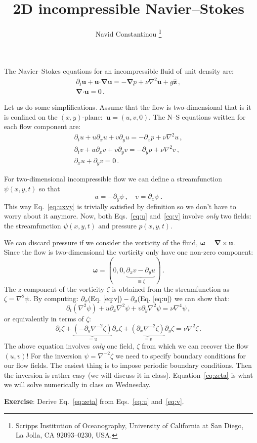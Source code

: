 \documentclass[11pt]{article}
\def\beq{\begin{equation}}
\def\eeq{\end{equation}}
\newcommand{\bu}{\boldsymbol{u}}
\providecommand\bnabla{\boldsymbol{\nabla}}
\providecommand\bcdot{\boldsymbol{\cdot}}
\newcommand{\com}{\, ,}
\newcommand{\per}{\, .}
\renewcommand{\(}{\left(}
\renewcommand{\[}{\left[}
\renewcommand{\)}{\right)}
\renewcommand{\]}{\right]}
\newcommand{\<}{\left\langle}
\renewcommand{\>}{\right\rangle}
\newcommand{\zhat}{\hat{\boldsymbol{z}}}
\begin{document}
\title{2D incompressible Navier--Stokes}

\author{
Navid Constantinou \thanks {Scripps Institution of Oceanography,
University of California at San Diego, La Jolla, CA
92093--0230, USA.
}
}


\maketitle

The Navier--Stokes equations for an incompressible fluid of unit density are:
\begin{gather}
\partial_t \bu + \bu\bcdot\bnabla\bu = -\bnabla p + \nu\nabla^2\bu + g\zhat \com\label{eq1}\\
\bnabla\bcdot\bu = 0 \per\label{eq2}
\end{gather}

Let us do some simplifications. Assume that the flow is two-dimensional that is it is confined on the $(x,y)$-plane:~$\bu=(u,v,0)$. The N--S equations written for each flow component are:
\begin{gather}
\partial_t u + u\partial_x u + v\partial_y u = -\partial_x p + \nu\nabla^2u \com\label{eq:u}\\
\partial_t v + u\partial_x v + v\partial_y v = -\partial_y p + \nu\nabla^2v \com\label{eq:v}\\
\partial_x u + \partial_y v = 0 \per\label{eq:uxvy}
\end{gather}

For two-dimensional incompressible flow we can define a streamfunction $\psi(x,y,t)$ so that
\beq
u = -\partial_y \psi\com\quad v= \partial_x\psi\per
\eeq
This way Eq.~\eqref{eq:uxvy} is trivially satisfied by definition so we don't have to worry about it anymore. Now, both Eqs.~\eqref{eq:u} and~\eqref{eq:v} involve {\it only} two fields: the streamfunction $\psi(x,y,t)$ and pressure $p(x,y,t)$.

We can discard pressure if we consider the vorticity of the fluid, $\boldsymbol{\omega} = \bnabla\times\bu$. Since the flow is two-dimensional the vorticity only have one non-zero component:
\beq
\boldsymbol{\omega} = (0, 0, \underbrace{\partial_x v - \partial_y u}_{\equiv \zeta})\per
\eeq
The $z$-component of the vorticity $\zeta$ is obtained from the streamfunction as $\zeta = \nabla^2\psi$. By computing: $\partial_x(\text{Eq.~\eqref{eq:v}}) - \partial_y(\text{Eq.~\eqref{eq:u}})$ we can show that:
\beq
\partial_t (\nabla^2\psi) + u\partial_x \nabla^2\psi + v\partial_y\nabla^2\psi = \nu\nabla^4\psi\com
\eeq
or equivalently in terms of $\zeta$:
\beq
\partial_t \zeta + \underbrace{(-\partial_y\nabla^{-2}\zeta)}_{=u} \partial_x \zeta + \underbrace{(\partial_x\nabla^{-2}\zeta)}_{=v}  \partial_y\zeta = \nu\nabla^2\zeta\per \label{eq:zeta}
\eeq
The above equation involves {\it only} one field, $\zeta$ from which we can recover the flow $(u,v)$! For the inversion $\psi=\nabla^{-2}\zeta$ we need to specify boundary conditions for our flow fields. The easiest thing is to impose periodic boundary conditions. Then the inversion is rather easy (we will discuss it in class). Equation~\eqref{eq:zeta} is what we will solve numerically in class on Wednesday.

\vspace{1em}

\noindent\textbf{Exercise}: Derive Eq.~\eqref{eq:zeta} from Eqs.~\eqref{eq:u} and~\eqref{eq:v}.
\end{document}
